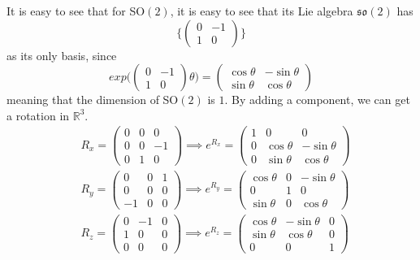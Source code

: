     It is easy to see that for SO$(2)$, it is easy to see that its Lie algebra $\mathfrak{so}(2)$ has 
    \begin{equation}
      \bigg\{ \begin{pmatrix}
      0&-1\\1&0
      \end{pmatrix}\bigg\}
    \end{equation}
    as its only basis, since 
    \begin{equation}
      exp  \bigg( \begin{pmatrix}
      0&-1\\1&0
      \end{pmatrix} \theta \bigg) = \begin{pmatrix}
      \cos{\theta} & - \sin{\theta} \\
      \sin{\theta} & \cos{\theta}
      \end{pmatrix}
    \end{equation}
    meaning that the dimension of SO$(2)$ is $1$. By adding a component, we can get a rotation in $\mathbb{R}^3$. 
    \begin{align*}
      & R_x = \begin{pmatrix}0&0&0\\0&0&-1\\0&1&0\end{pmatrix} \implies e^{R_x} = \begin{pmatrix}
      1&0&0\\ 0&\cos{\theta}&-\sin{\theta}\\0&\sin{\theta}&\cos{\theta}
      \end{pmatrix}\\
      & R_y = \begin{pmatrix}0&0&1\\0&0&0\\-1&0&0\end{pmatrix} \implies e^{R_y} = \begin{pmatrix}
      \cos{\theta} & 0 & -\sin{\theta}\\ 0&1&0 \\
      \sin{\theta}& 0 & \cos{\theta} \end{pmatrix} \\
      & R_z = \begin{pmatrix}0&-1&0\\1&0&0\\0&0&0\end{pmatrix} \implies e^{R_z} = \begin{pmatrix}
      \cos{\theta} & -\sin{\theta} & 0\\
      \sin{\theta}& \cos{\theta} & 0 \\ 0 & 0 & 1\end{pmatrix}
    \end{align*}
